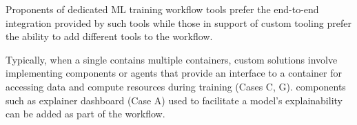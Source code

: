 
Proponents of dedicated ML training workflow tools prefer the end-to-end integration provided by such tools while those in support of custom tooling prefer the ability to add different tools to the workflow.
\DIFaddbegin 

\DIFaddend Typically, when a single \DIFdelbegin {}\DIFdelend \DIFaddbegin {}\DIFaddend contains multiple containers, custom solutions involve implementing components or agents that provide an interface to a container for accessing data and compute resources during training (Cases C, G). \DIFdelbegin {}\DIFdelend \DIFaddbegin {}\DIFaddend components such as explainer dashboard (\DIFdelbegin {}\DIFdelend Case A) \DIFaddbegin {}\DIFaddend used to facilitate a model's explainability can be added as part of the workflow.

\DIFdelbegin %



